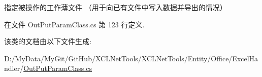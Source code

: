 指定被操作的工作薄文件 （用于向已有文件中写入数据并导出的情况） 



在文件 Out\-Put\-Param\-Class.\-cs 第 123 行定义.



该类的文档由以下文件生成\-:\begin{DoxyCompactItemize}
\item 
D\-:/\-My\-Data/\-My\-Git/\-Git\-Hub/\-X\-C\-L\-Net\-Tools/\-X\-C\-L\-Net\-Tools/\-Entity/\-Office/\-Excel\-Handler/\hyperlink{_out_put_param_class_8cs}{Out\-Put\-Param\-Class.\-cs}\end{DoxyCompactItemize}
